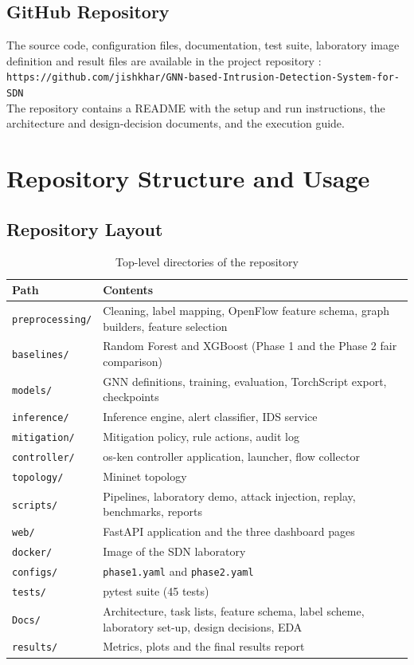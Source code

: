 \begin{appendices}
\section{GitHub Repository}
The source code, configuration files, documentation, test suite, laboratory image definition and result files are available in the project repository \cite{bib:repo}:\\
\texttt{https://github.com/jishkhar/GNN-based-Intrusion-Detection-System-for-SDN}\\
The repository contains a README with the setup and run instructions, the architecture and design-decision documents, and the execution guide.


\chapter{Repository Structure and Usage}
\section{Repository Layout}
\begin{table}[htbp]
\centering
\caption{Top-level directories of the repository}
\label{tab:repo}
\small
\begin{tabularx}{\textwidth}{|p{3.4cm}|X|}
\hline
\textbf{Path} & \textbf{Contents} \\ \hline
\texttt{preprocessing/} & Cleaning, label mapping, OpenFlow feature schema, graph builders, feature selection \\ \hline
\texttt{baselines/} & Random Forest and XGBoost (Phase 1 and the Phase 2 fair comparison) \\ \hline
\texttt{models/} & GNN definitions, training, evaluation, TorchScript export, checkpoints \\ \hline
\texttt{inference/} & Inference engine, alert classifier, IDS service \\ \hline
\texttt{mitigation/} & Mitigation policy, rule actions, audit log \\ \hline
\texttt{controller/} & os-ken controller application, launcher, flow collector \\ \hline
\texttt{topology/} & Mininet topology \\ \hline
\texttt{scripts/} & Pipelines, laboratory demo, attack injection, replay, benchmarks, reports \\ \hline
\texttt{web/} & FastAPI application and the three dashboard pages \\ \hline
\texttt{docker/} & Image of the SDN laboratory \\ \hline
\texttt{configs/} & \texttt{phase1.yaml} and \texttt{phase2.yaml} \\ \hline
\texttt{tests/} & pytest suite (45 tests) \\ \hline
\texttt{Docs/} & Architecture, task lists, feature schema, label scheme, laboratory set-up, design decisions, EDA \\ \hline
\texttt{results/} & Metrics, plots and the final results report \\ \hline
\end{tabularx}
\end{table}


\end{appendices}
